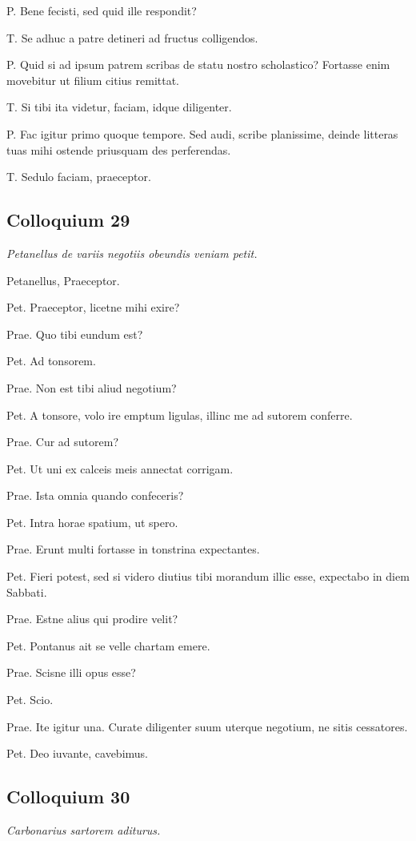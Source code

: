 \documentclass{article}
\begin{document}
P. Bene fecisti, sed quid ille respondit?

T. Se adhuc a patre detineri ad fructus colligendos.

P. Quid si ad ipsum patrem scribas de statu nostro scholastico? Fortasse enim movebitur ut filium citius remittat.

T. Si tibi ita videtur, faciam, idque diligenter.

P. Fac igitur primo quoque tempore. Sed audi, scribe planissime, deinde litteras tuas mihi ostende priusquam des perferendas.

T. Sedulo faciam, praeceptor.

\subsection{Colloquium 29}
\emph{Petanellus de variis negotiis obeundis veniam petit.}

Petanellus, Praeceptor.

Pet. Praeceptor, licetne mihi exire?

Prae. Quo tibi eundum est?

Pet. Ad tonsorem.

Prae. Non est tibi aliud negotium?

Pet. A tonsore, volo ire emptum ligulas, illinc me ad sutorem conferre.

Prae. Cur ad sutorem?

Pet. Ut uni ex calceis meis annectat corrigam.

Prae. Ista omnia quando confeceris?

Pet. Intra horae spatium, ut spero.

Prae. Erunt multi fortasse in tonstrina expectantes.

Pet. Fieri potest, sed si videro diutius tibi morandum illic esse, expectabo in diem Sabbati.

Prae. Estne alius qui prodire velit?

Pet. Pontanus ait se velle chartam emere.

Prae. Scisne illi opus esse?

Pet. Scio.

Prae. Ite igitur una. Curate diligenter suum uterque negotium, ne sitis cessatores.

Pet. Deo iuvante, cavebimus.

\subsection{Colloquium 30}
\emph{Carbonarius sartorem aditurus.}
\end{document}
